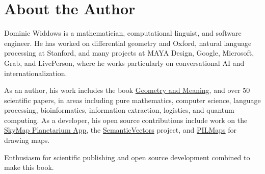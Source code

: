 \chapter{About the Author}

Dominic Widdows is a mathematician, computational linguist, and software engineer.
He has worked on differential geometry and Oxford, natural language processing at Stanford,
and many projects at MAYA Design, Google, Microsoft, Grab, and LivePerson, where he works
particularly on conversational AI and internationalization.

As an author, his work includes the book \href{https://www.amazon.com/-/dp/B00J4FZOOY/}{Geometry and Meaning},
and over 50 scientific papers, in areas including pure mathematics,
computer science, language processing, bioinformatics, information extraction, logistics, and quantum computing.
As a developer, his open source contributions include work on the
\href{https://github.com/sky-map-team/stardroid}{SkyMap Planetarium App},
the \href{https://github.com/semanticvectors}{SemanticVectors} project, and
\href{https://github.com/dwiddows/pilmaps}{PILMaps} for drawing maps.

Enthusiasm for scientific publishing and open source development combined to make this book. 




